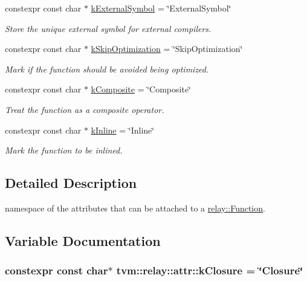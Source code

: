 \begin{DoxyCompactItemize}
constexpr const char $\ast$ \hyperlink{namespacetvm_1_1relay_1_1attr_ae61f67fa7105e9ef262770ccc840cdb4}{k\+External\+Symbol} = \char`\"{}External\+Symbol\char`\"{}
\begin{DoxyCompactList}\small\item\em Store the unique external symbol for external compilers. \end{DoxyCompactList}\item 
constexpr const char $\ast$ \hyperlink{namespacetvm_1_1relay_1_1attr_aed3671df7e12d228b8070806d07f7c62}{k\+Skip\+Optimization} = \char`\"{}Skip\+Optimization\char`\"{}
\begin{DoxyCompactList}\small\item\em Mark if the function should be avoided being optimized. \end{DoxyCompactList}\item 
constexpr const char $\ast$ \hyperlink{namespacetvm_1_1relay_1_1attr_a04f8f1b117293d37651f8c81135802a2}{k\+Composite} = \char`\"{}Composite\char`\"{}
\begin{DoxyCompactList}\small\item\em Treat the function as a composite operator. \end{DoxyCompactList}\item 
constexpr const char $\ast$ \hyperlink{namespacetvm_1_1relay_1_1attr_ad294262b6b1ca1b7bf3924a139f17562}{k\+Inline} = \char`\"{}Inline\char`\"{}
\begin{DoxyCompactList}\small\item\em Mark the function to be inlined. \end{DoxyCompactList}\end{DoxyCompactItemize}


\subsection{Detailed Description}
namespace of the attributes that can be attached to a \hyperlink{classtvm_1_1relay_1_1Function}{relay\+::\+Function}. 

\subsection{Variable Documentation}
\subsubsection[{\texorpdfstring{k\+Closure}{kClosure}}]{\setlength{\rightskip}{0pt plus 5cm}constexpr const char$\ast$ tvm\+::relay\+::attr\+::k\+Closure = \char`\"{}Closure\char`\"{}}\hypertarget{namespacetvm_1_1relay_1_1attr_aef553198f20f8cd26b73cdfa61baec2a}{}\label{namespacetvm_1_1relay_1_1attr_aef553198f20f8cd26b73cdfa61baec2a}


